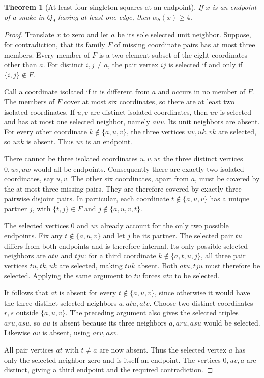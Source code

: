 \documentclass[11pt,a4paper]{article}
\newtheorem{theorem}{Theorem}[section]
\theoremstyle{definition}
\theoremstyle{remark}
\newcommand{\Q}{Q}
\begin{document}
\begin{theorem}[At least four singleton squares at an endpoint]\label{thm:endpoint-four}
If $x$ is an endpoint of a snake in $\Q_9$ having at least one edge, then $\alpha_S(x)\ge4$.
\end{theorem}
\begin{proof}
Translate $x$ to zero and let $a$ be its sole selected unit neighbor. Suppose, for contradiction, that its family $F$ of missing coordinate pairs has at most three members. Every member of $F$ is a two-element subset of the eight coordinates other than $a$. For distinct $i,j\ne a$, the pair vertex $ij$ is selected if and only if $\{i,j\}\notin F$.

Call a coordinate isolated if it is different from $a$ and occurs in no member of $F$. The members of $F$ cover at most six coordinates, so there are at least two isolated coordinates. If $u,v$ are distinct isolated coordinates, then $uv$ is selected and has at most one selected neighbor, namely $auv$. Its unit neighbors are absent. For every other coordinate $k\notin\{a,u,v\}$, the three vertices $uv,uk,vk$ are selected, so $uvk$ is absent. Thus $uv$ is an endpoint.

There cannot be three isolated coordinates $u,v,w$: the three distinct vertices $0,uv,uw$ would all be endpoints. Consequently there are exactly two isolated coordinates, say $u,v$. The other six coordinates, apart from $a$, must be covered by the at most three missing pairs. They are therefore covered by exactly three pairwise disjoint pairs. In particular, each coordinate $t\notin\{a,u,v\}$ has a unique partner $j$, with $\{t,j\}\in F$ and $j\notin\{a,u,v,t\}$.

The selected vertices $0$ and $uv$ already account for the only two possible endpoints. Fix any $t\notin\{a,u,v\}$ and let $j$ be its partner. The selected pair $tu$ differs from both endpoints and is therefore internal. Its only possible selected neighbors are $atu$ and $tju$: for a third coordinate $k\notin\{a,t,u,j\}$, all three pair vertices $tu,tk,uk$ are selected, making $tuk$ absent. Both $atu,tju$ must therefore be selected. Applying the same argument to $tv$ forces $atv$ to be selected.

It follows that $at$ is absent for every $t\notin\{a,u,v\}$, since otherwise it would have the three distinct selected neighbors $a,atu,atv$. Choose two distinct coordinates $r,s$ outside $\{a,u,v\}$. The preceding argument also gives the selected triples $aru,asu$, so $au$ is absent because its three neighbors $a,aru,asu$ would be selected. Likewise $av$ is absent, using $arv,asv$.

All pair vertices $at$ with $t\ne a$ are now absent. Thus the selected vertex $a$ has only the selected neighbor zero and is itself an endpoint. The vertices $0,uv,a$ are distinct, giving a third endpoint and the required contradiction.
\end{proof}
\end{document}
